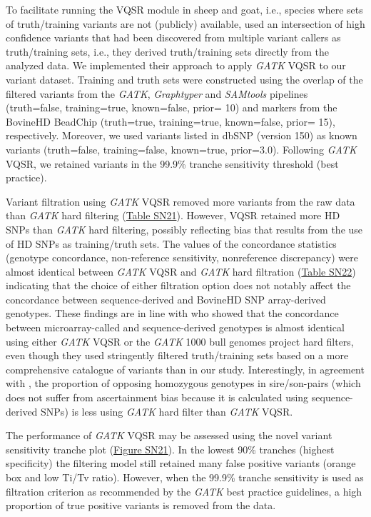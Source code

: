 \documentclass[../main.tex]{subfiles}
\begin{document}
\begin{flushleft}
To facilitate running the VQSR module in sheep and goat, i.e., species where sets of
truth/training variants are not (publicly) available, \citet{alberto2018convergent} used an
intersection of high confidence variants that had been discovered from multiple variant
callers as truth/training sets, i.e., they derived truth/training sets directly from the analyzed
data. We implemented their approach to apply \emph{GATK} VQSR to our variant dataset. Training
and truth sets were constructed using the overlap of the filtered variants from the \emph{GATK},
\emph{Graphtyper} and \emph{SAMtools} pipelines (truth=false, training=true, known=false, prior= 10) and
markers from the BovineHD BeadChip (truth=true, training=true, known=false, prior= 15),
respectively. Moreover, we used variants listed in dbSNP (version 150) as known variants
(truth=false, training=false, known=true, prior=3.0). Following \emph{GATK} VQSR, we retained
variants in the 99.9\% tranche sensitivity threshold (best practice).

\bigskip

Variant filtration using \emph{GATK} VQSR removed more variants from the raw data than \emph{GATK}
hard filtering (\hyperlink{Table SN21}{Table SN21}). However, VQSR retained more HD SNPs than \emph{GATK} hard filtering,
possibly reflecting bias that results from the use of HD SNPs as training/truth sets. The
values of the concordance statistics (genotype concordance, non-reference sensitivity, nonreference discrepancy) were almost identical between \emph{GATK} VQSR and \emph{GATK} hard
filtration (\hyperlink{Table SN22}{Table SN22}) indicating that the choice of either filtration option does not notably affect
the concordance between sequence-derived and BovineHD SNP array-derived genotypes.
These findings are in line with \citet{vander2018best} who showed that the concordance
between microarray-called and sequence-derived genotypes is almost identical using either
\emph{GATK} VQSR or the \emph{GATK} 1000 bull genomes project hard filters, even though they used
stringently filtered truth/training sets based on a more comprehensive catalogue of variants
than in our study. Interestingly, in agreement with \citet{vander2018best}, the proportion
of opposing homozygous genotypes in sire/son-pairs (which does not suffer from
ascertainment bias because it is calculated using sequence-derived SNPs) is less using
\emph{GATK} hard filter than \emph{GATK} VQSR.

\bigskip

The performance of \emph{GATK} VQSR may be assessed using the novel variant sensitivity
tranche plot (\hyperlink{Figure SN21}{Figure SN21}). In the lowest 90\% tranches (highest specificity) the filtering model
still retained many false positive variants (orange box and low Ti/Tv ratio). However, when
the 99.9\% tranche sensitivity is used as filtration criterion as recommended by the \emph{GATK}
best practice guidelines, a high proportion of true positive variants is removed from the
data. 


\end{flushleft}
\end{document}
